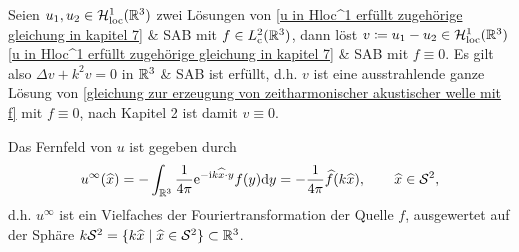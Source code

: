 Seien \(u_1,u_2\in\mathcal{H}_{\mathrm{loc}}^1(\mathbb{R}^3)\) zwei Lösungen von \eqref{u in Hloc^1 erfüllt zugehörige gleichung in kapitel 7} \& SAB mit \(f\in L_{\mathrm{c}}^2(\mathbb{R}^3)\), dann löst \(v\coloneqq u_1-u_2\in\mathcal{H}_{\mathrm{loc}}^1(\mathbb{R}^3)\) \eqref{u in Hloc^1 erfüllt zugehörige gleichung in kapitel 7} \& SAB mit \(f\equiv0\). Es gilt also \(\Delta v+k^2v=0\) in \(\mathbb{R}^3\) \& SAB ist erfüllt, d.h. \(v\) ist eine ausstrahlende ganze Lösung von \eqref{gleichung zur erzeugung von zeitharmonischer akustischer welle mit f} mit \(f\equiv0\), nach Kapitel 2 ist damit \(v\equiv0\).

Das Fernfeld von \(u\) ist gegeben durch
\begin{equation}
	\label{fernfeld von u}
	u^\infty(\widehat{x})=-\int_{\mathbb{R}^3}\frac{1}{4\pi}\mathrm{e}^{-\mathrm{i} k\widehat{x}\cdot y}f(y)\mathrm{d}y=-\frac{1}{4\pi}\widehat{f}(k\widehat{x}),\qquad\widehat{x}\in\mathcal{S}^2,
\end{equation}
d.h. \(u^\infty\) ist ein Vielfaches der Fouriertransformation der Quelle \(f\), ausgewertet auf der Sphäre \(k\mathcal{S}^2=\{k\widehat{x}\mid\widehat{x}\in\mathcal{S}^2\}\subset\mathbb{R}^3\).

